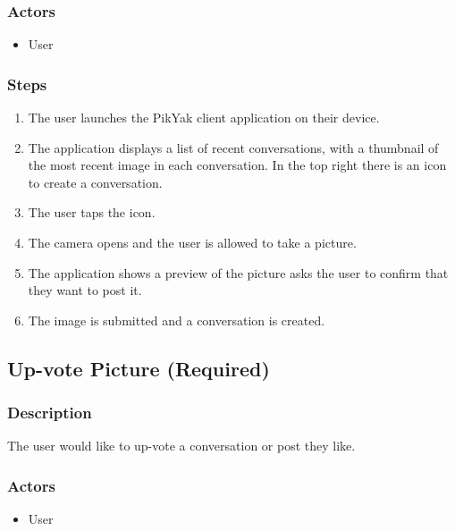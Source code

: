 \documentclass[11pt]{scrartcl}
\begin{document}
        \subsubsection{Actors}
            \begin{itemize}
                \item User
            \end{itemize}
        \subsubsection{Steps}
            \begin{enumerate}
                \item The user launches the PikYak client application on their device.
                \item The application displays a list of recent conversations, with a thumbnail of the most recent image in each conversation. In the top right there is an icon to create a conversation.
                \item The user taps the icon.
                \item The camera opens and the user is allowed to take a picture.
                \item The application shows a preview of the picture asks the user to confirm that they want to post it.
                \item The image is submitted and a conversation is created.
            \end{enumerate}
    
    \subsection{Up-vote Picture (Required)}
    \label{sec:upvote}
        \subsubsection{Description}
            The user would like to up-vote a conversation or post they like.
        \subsubsection{Actors}
            \begin{itemize}
                \item User
            \end{itemize}
\end{document}
